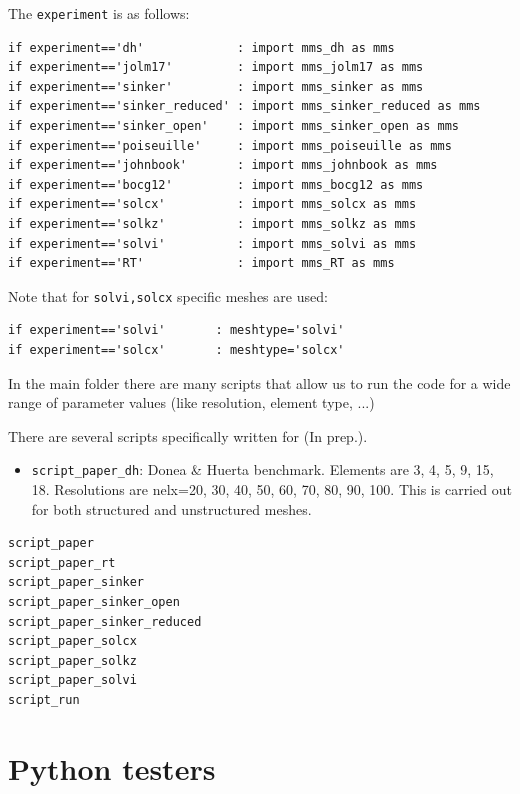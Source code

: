 The \lstinline{experiment} is as follows:
\begin{lstlisting}
if experiment=='dh'             : import mms_dh as mms 
if experiment=='jolm17'         : import mms_jolm17 as mms 
if experiment=='sinker'         : import mms_sinker as mms 
if experiment=='sinker_reduced' : import mms_sinker_reduced as mms 
if experiment=='sinker_open'    : import mms_sinker_open as mms 
if experiment=='poiseuille'     : import mms_poiseuille as mms 
if experiment=='johnbook'       : import mms_johnbook as mms 
if experiment=='bocg12'         : import mms_bocg12 as mms 
if experiment=='solcx'          : import mms_solcx as mms 
if experiment=='solkz'          : import mms_solkz as mms 
if experiment=='solvi'          : import mms_solvi as mms 
if experiment=='RT'             : import mms_RT as mms 
\end{lstlisting}
Note that for \lstinline{solvi,solcx} specific meshes are used:
\begin{lstlisting}
if experiment=='solvi'       : meshtype='solvi'
if experiment=='solcx'       : meshtype='solcx'
\end{lstlisting}


In the main folder there are many scripts that allow us to run the code
for a wide range of parameter values (like resolution, element type, ...)


There are several scripts specifically written for 
\textcite{thba24} (In prep.).
\begin{itemize}
\item {\tt script\_paper\_dh}: Donea \& Huerta benchmark.
Elements are 3, 4, 5, 9, 15, 18. 
Resolutions are nelx=20, 30, 40, 50, 60, 70, 80, 90, 100.
This is carried out for both structured and unstructured meshes.
\end{itemize}

\begin{verbatim}
script_paper
script_paper_rt
script_paper_sinker
script_paper_sinker_open
script_paper_sinker_reduced
script_paper_solcx
script_paper_solkz
script_paper_solvi
script_run
\end{verbatim}


\section*{Python testers}


